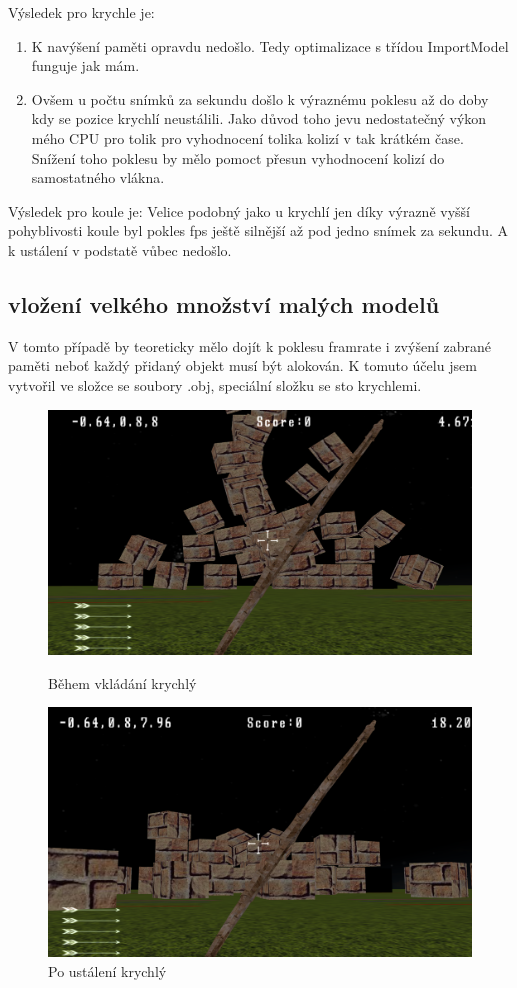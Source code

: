 Výsledek pro krychle je: 
\begin{enumerate}
	\item K navýšení paměti opravdu nedošlo. Tedy optimalizace s třídou ImportModel funguje jak mám.
	\item Ovšem u počtu snímků za sekundu došlo k výraznému poklesu až do doby kdy se pozice krychlí neustálili. Jako důvod toho jevu nedostatečný výkon mého CPU pro tolik pro vyhodnocení tolika kolizí v tak krátkém čase. Snížení toho poklesu by mělo pomoct přesun vyhodnocení kolizí do samostatného vlákna.
\end{enumerate}
Výsledek pro koule je: 
Velice podobný jako u krychlí jen díky výrazně vyšší pohyblivosti koule byl pokles fps ještě silnější až pod jedno snímek za sekundu. A k ustálení v podstatě vůbec nedošlo.
\subsection{vložení velkého množství malých modelů}
V tomto případě by teoreticky mělo dojít k poklesu framrate i zvýšení zabrané paměti neboť každý přidaný objekt musí být alokován. K tomuto účelu jsem vytvořil ve složce se soubory .obj, speciální složku se sto krychlemi.
\begin{figure}[!tbp]
	\centering
	\begin{minipage}[b]{0.4\textwidth}
		\includegraphics[width=\textwidth]{obrazky-figures/17}
		\caption{Během vkládání krychlý}
	\end{minipage}
	\hfill
	\begin{minipage}[b]{0.4\textwidth}
		\includegraphics[width=\textwidth]{obrazky-figures/18}
		\caption{Po ustálení krychlý}
	\end{minipage}
\end{figure}

